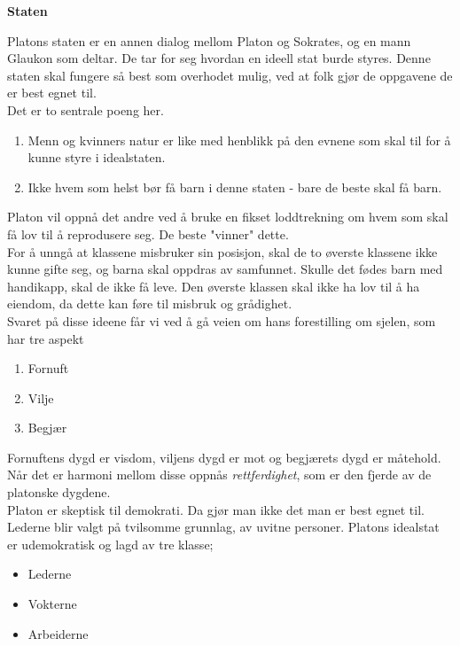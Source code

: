\documentclass[11pt, a4paper]{article}
\newenvironment{sectionbox}[1][]{%
    \begin{sectionboxinner}
    \textbf{\large #1}
    \vspace{1pt}
    \newline
}{%
    \end{sectionboxinner}
}
\begin{document}
\begin{sectionbox}[Staten]


Platons staten er en annen dialog mellom Platon og Sokrates, og en mann Glaukon som deltar. De tar for seg hvordan en ideell stat burde styres. Denne staten skal fungere så best som overhodet mulig, ved at folk gjør de oppgavene de er best egnet til. \\

Det er to sentrale poeng her.
\begin{enumerate}
    \item Menn og kvinners natur er like med henblikk på den evnene som skal til for å kunne styre i idealstaten.
    \item Ikke hvem som helst bør få barn i denne staten - bare de beste skal få barn.
\end{enumerate}

Platon vil oppnå det andre ved å bruke en fikset loddtrekning om hvem som skal få lov til å reprodusere seg. De beste "vinner" dette.\\

For å unngå at klassene misbruker sin posisjon, skal de to øverste klassene ikke kunne gifte seg, og barna skal oppdras av samfunnet. Skulle det fødes barn med handikapp, skal de ikke få leve. Den øverste klassen skal ikke ha lov til å ha eiendom, da dette kan føre til misbruk og grådighet.\\


Svaret på disse ideene får vi ved å gå veien om hans forestilling om sjelen, som har tre aspekt
\begin{enumerate}
    \item Fornuft
    \item Vilje
    \item Begjær
\end{enumerate}

Fornuftens dygd er visdom, viljens dygd er mot og begjærets dygd er måtehold. Når det er harmoni mellom disse oppnås \textit{rettferdighet}, som er den fjerde av de platonske dygdene.\\

Platon er skeptisk til demokrati. Da gjør man ikke det man er best egnet til. Lederne blir valgt på tvilsomme grunnlag, av uvitne personer. Platons idealstat er udemokratisk og lagd av tre klasse;
\begin{itemize}
    \item Lederne
    \item Vokterne
    \item Arbeiderne
\end{itemize}


\end{sectionbox}
\end{document}

